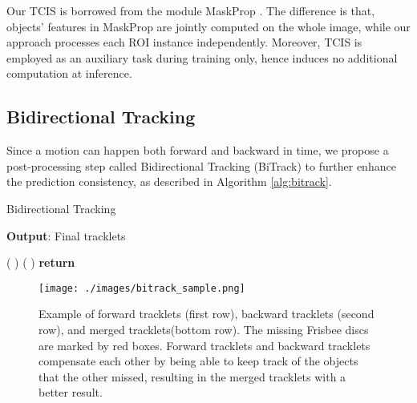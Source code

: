 \documentclass[10pt,twocolumn,letterpaper]{article}
\begin{document}
Our TCIS is borrowed from the module MaskProp \cite{Bertasius2020}. The difference is that, objects' features in MaskProp are jointly computed on the whole image, while our approach processes each ROI instance independently. Moreover, TCIS is employed as an auxiliary task during training only, hence induces no additional computation at inference.
 \subsection{Bidirectional Tracking}
\label{sec:bidirectional-tracking}

Since a motion can happen both forward and backward in time, we propose a post-processing step called Bidirectional Tracking (BiTrack) to further enhance the prediction consistency, as described in Algorithm \ref{alg:bitrack}.

\begin{algorithm}[!h]
	\small
	\caption{Bidirectional Tracking}
	\label{alg:bitrack}
	\SetAlgoLined
	\textbf{Output}: Final tracklets 
	
	    (   )  (   ) \;
	\textbf{return} 
\end{algorithm}

\begin{figure*}[!h]
	\centering
	\texttt{[image: ./images/bitrack\_sample.png]}
	\caption{\small Example of forward tracklets (first row), backward tracklets (second row), and merged tracklets(bottom row). The missing Frisbee discs are marked by red boxes. Forward tracklets and backward tracklets compensate each other by being able to keep track of the objects that the other missed, resulting in the merged tracklets with a better result.} \label{fig:bitrack}
\end{figure*}
\end{document}
